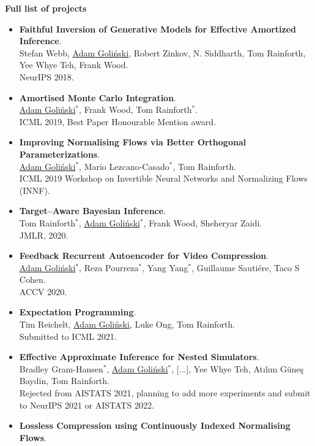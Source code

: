 \documentclass[12pt]{article}
\begin{document}
\vspace{10pt}
\textbf{Full list of projects}
\begin{itemize}
\item \textbf{Faithful Inversion of Generative Models for Effective Amortized Inference}. \\
Stefan Webb, \underline{Adam Goli{\'n}ski}, Robert Zinkov, N. Siddharth, Tom Rainforth, Yee Whye Teh, Frank Wood. \\
NeurIPS 2018. 
\item \textbf{Amortised Monte Carlo Integration}. \\
\underline{Adam Goli{\'n}ski}$^{*}$, Frank Wood, Tom Rainforth$^{*}$. \\
ICML 2019, Best Paper Honourable Mention award.
\item \textbf{Improving Normalising Flows via Better Orthogonal Parameterizations}. \\
\underline{Adam Goli{\'n}ski}$^{*}$, Mario Lezcano-Casado$^{*}$, Tom Rainforth. \\
ICML 2019 Workshop on Invertible Neural Networks and Normalizing Flows (INNF).
\item \textbf{Target–Aware Bayesian Inference}.\\
Tom Rainforth$^{*}$, \underline{Adam Goli{\'n}ski}$^{*}$, Frank Wood, Sheheryar Zaidi. \\
JMLR, 2020.
\item \textbf{Feedback Recurrent Autoencoder for Video Compression}.\\
\underline{Adam Goli{\'n}ski}$^{*}$, Reza Pourreza$^{*}$, Yang Yang$^{*}$, Guillaume Sautiére, Taco S Cohen. \\
ACCV 2020.
\item \textbf{Expectation Programming}.\\
Tim Reichelt, \underline{Adam Goli{\'n}ski}, Luke Ong, Tom Rainforth.\\
Submitted to ICML 2021.
\item \textbf{Effective Approximate Inference for Nested Simulators}. \\
Bradley Gram-Hansen$^{*}$, \underline{Adam Goli{\'n}ski}$^{*}$, [...], Yee Whye Teh, Atılım Güneş Baydin, Tom Rainforth.\\
Rejected from AISTATS 2021, planning to add more experiments and submit to NeurIPS 2021 or AISTATS 2022. \\
\item \textbf{Lossless Compression using Continuously Indexed Normalising Flows}.\\

\end{itemize}
\end{document}
